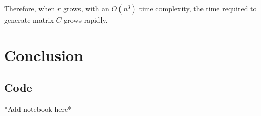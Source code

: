\documentclass[11pt]{article}
\begin{document}
Therefore, when $r$ grows, with an $O(n^3)$ time complexity, the time required to generate matrix $C$ grows rapidly.



\section{Conclusion}






\newpage




\newpage
\appendix
\subsection*{Code}
*Add notebook here*
\end{document}
